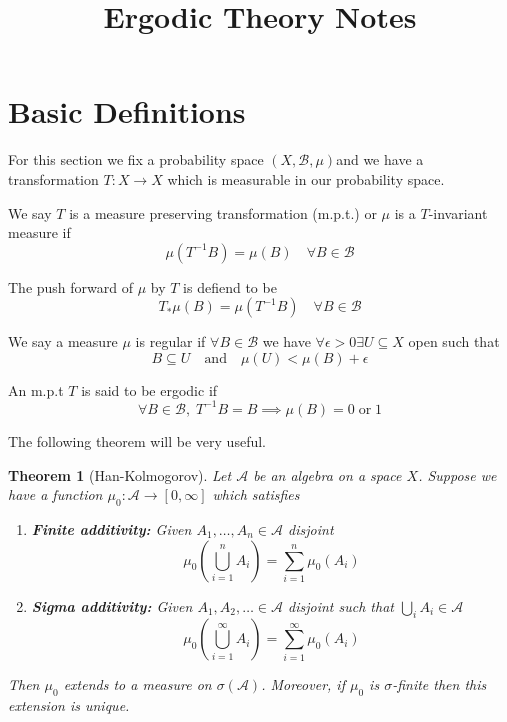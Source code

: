 \documentclass[11pt]{article}
\title{Ergodic Theory Notes}
\author{}
\date{}
\newcommand{\msrspc}{\ensuremath{(X,\mathcal{B},\mu)}}
\newenvironment{defin}
	{\begin{mdframed}[backgroundcolor=white, roundcorner=5pt, linewidth=1pt]}
	{\end{mdframed}}
\newcommand{\mdf}[1]{{\color{red} #1}}
\newtheorem{theorem}[prop]{Theorem}
\begin{document}
\maketitle

\section{Basic Definitions}

For this section we fix a probability space \msrspc and we have a transformation $T:X\to X$ which is measurable in our probability space.

\begin{defin}
	
We say $T$ is a \mdf{measure preserving transformation (m.p.t.)} or $\mu$ is a \mdf{$T$-invariant measure} if 
$$\mu(T^{-1}B)=\mu(B)\quad\forall B\in\mathcal{B}$$

The \mdf{push forward of $\mu$ by $T$} is defiend to be
	$$T_*\mu(B)=\mu(T^{-1}B)\quad\forall B \in\mathcal{B}$$

We say a measure $\mu$ is \mdf{regular} if $\forall B\in\mathcal{B}$ we have $\forall\epsilon >0 \exists U\subseteq X$ open such that
$$B\subseteq U \quad \text{and} \quad \mu(U) < \mu(B) + \epsilon$$

An m.p.t $T$ is said to be \mdf{ergodic} if
$$\forall B\in\mathcal{B},\; T^{-1}B=B \implies \mu(B)=0\;\text{or}\;1$$

\end{defin}

The following theorem will be very useful.

\begin{theorem}[Han-Kolmogorov]
Let $\mathcal{A}$ be an algebra on a space $X$.
Suppose we have a function $\mu_0:\mathcal{A}\to [0, \infty]$ which satisfies
\begin{enumerate}[label=(\roman*)]
	\item \textbf{Finite additivity: }Given $A_1, \dots, A_n\in\mathcal{A}$ disjoint
		\[
			\mu_0\left( \bigcup_{i=1}^n A_i\right)=\sum_{i=1}^{n}\mu_0(A_i)
		\]
	\item \textbf{Sigma additivity: }Given $A_1, A_2, \dots \in \mathcal{A}$ disjoint such that $\bigcup_i A_i\in\mathcal{A}$
		\[
			\mu_0\left( \bigcup_{i=1}^\infty A_i \right) = \sum_{i=1}^{\infty}\mu_0(A_i)
		\]
\end{enumerate}
Then $\mu_0$ extends to a measure on $\sigma(\mathcal{A})$.
Moreover, if $\mu_0$ is $\sigma$-finite then this extension is unique.
\end{theorem}
\end{document}
